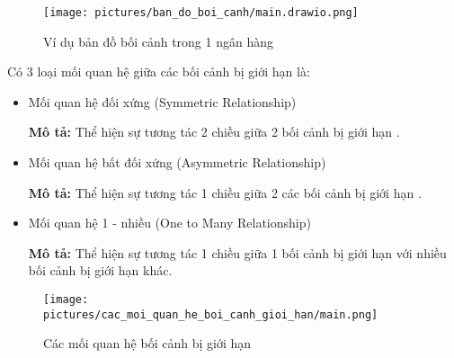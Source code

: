 \begin{figure}[H]

    \centering

    \texttt{[image: pictures/ban\_do\_boi\_canh/main.drawio.png]}

    \caption{Ví dụ bản đồ bối cảnh trong 1 ngân hàng}

\end{figure}












Có 3 loại mối quan hệ giữa các bối cảnh bị giới hạn là:

\begin{itemize}

    \item Mối quan hệ đối xứng (Symmetric Relationship)

          \textbf{Mô tả:} Thể hiện sự tương tác 2 chiều giữa 2 bối cảnh bị giới hạn .

    \item Mối quan hệ bất đối xứng (Asymmetric Relationship)

          \textbf{Mô tả:} Thể hiện sự tương tác 1 chiều giữa 2 các bối cảnh bị giới hạn .

    \item Mối quan hệ 1 - nhiều (One to Many Relationship)

          \textbf{Mô tả:} Thể hiện sự tương tác 1 chiều giữa 1 bối cảnh bị giới hạn với nhiều bối cảnh bị giới hạn khác.

\end{itemize}

\begin{figure}[H]

    \centering

    \texttt{[image: pictures/cac\_moi\_quan\_he\_boi\_canh\_gioi\_han/main.png]}

    \caption{Các mối quan hệ bối cảnh bị giới hạn}

\end{figure}

